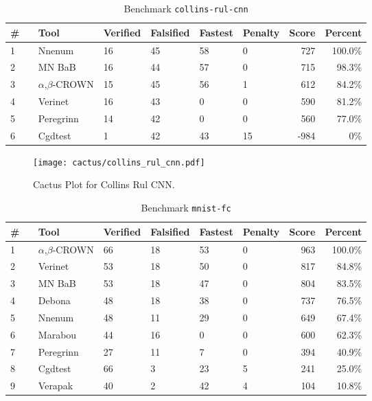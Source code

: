 \begin{table}[h]
\begin{center}
\caption{Benchmark \texttt{collins-rul-cnn}} \label{tab:cat_{cat}}
{\setlength{\tabcolsep}{2pt}
\begin{tabular}[h]{@{}llllllrr@{}}
\toprule
\textbf{\# ~} & \textbf{Tool} & \textbf{Verified} & \textbf{Falsified} & \textbf{Fastest} & \textbf{Penalty} & \textbf{Score} & \textbf{Percent}\\
\midrule
1 & Nnenum & 16 & 45 & 58 & 0 & 727 & 100.0\% \\
2 & MN BaB & 16 & 44 & 57 & 0 & 715 & 98.3\% \\
3 & $\alpha$,$\beta$-CROWN & 15 & 45 & 56 & 1 & 612 & 84.2\% \\
4 & Verinet & 16 & 43 & 0 & 0 & 590 & 81.2\% \\
5 & Peregrinn & 14 & 42 & 0 & 0 & 560 & 77.0\% \\
6 & Cgdtest & 1 & 42 & 43 & 15 & -984 & 0\% \\
\bottomrule
\end{tabular}
}
\end{center}
\end{table}



\begin{figure}[h]
\centerline{\texttt{[image: cactus/collins\_rul\_cnn.pdf]}}
\caption{Cactus Plot for Collins Rul CNN.}
\label{fig:quantPic}
\end{figure}



\begin{table}[h]
\begin{center}
\caption{Benchmark \texttt{mnist-fc}} \label{tab:cat_{cat}}
{\setlength{\tabcolsep}{2pt}
\begin{tabular}[h]{@{}llllllrr@{}}
\toprule
\textbf{\# ~} & \textbf{Tool} & \textbf{Verified} & \textbf{Falsified} & \textbf{Fastest} & \textbf{Penalty} & \textbf{Score} & \textbf{Percent}\\
\midrule
1 & $\alpha$,$\beta$-CROWN & 66 & 18 & 53 & 0 & 963 & 100.0\% \\
2 & Verinet & 53 & 18 & 50 & 0 & 817 & 84.8\% \\
3 & MN BaB & 53 & 18 & 47 & 0 & 804 & 83.5\% \\
4 & Debona & 48 & 18 & 38 & 0 & 737 & 76.5\% \\
5 & Nnenum & 48 & 11 & 29 & 0 & 649 & 67.4\% \\
6 & Marabou & 44 & 16 & 0 & 0 & 600 & 62.3\% \\
7 & Peregrinn & 27 & 11 & 7 & 0 & 394 & 40.9\% \\
8 & Cgdtest & 66 & 3 & 23 & 5 & 241 & 25.0\% \\
9 & Verapak & 40 & 2 & 42 & 4 & 104 & 10.8\% \\
\bottomrule
\end{tabular}
}
\end{center}
\end{table}



